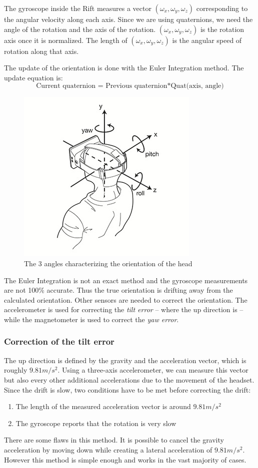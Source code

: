 \documentclass[12pt, twoside]{article}
\begin{document}
The gyroscope inside the Rift measures a vector $(\omega_x,\omega_y,\omega_z)$ corresponding to the angular velocity along each axis. Since we are using quaternions, we need the angle of the rotation and the axis of the rotation. $(\omega_x,\omega_y,\omega_z)$ is the rotation axis once it is normalized. The length of $(\omega_x,\omega_y,\omega_z)$ is the angular speed of rotation along that axis.

The update of the orientation is done with the Euler Integration method. The update equation is:
$$\text{Current quaternion = Previous quaternion} * \text{Quat(axis, angle)}$$

\begin{figure}[h]
  \centering
  \includegraphics[scale=3]{OculusHead.jpg}
  \caption{\label{fig:ypr} The 3 angles characterizing the orientation of the head\protect\footnotemark}
\end{figure}

The Euler Integration is not an exact method and the gyroscope measurements are not 100\% accurate. Thus the true orientation is drifting away from the calculated orientation. Other sensors are needed to correct the orientation. The accelerometer is used for correcting the \textit{tilt error} -- where the up direction is -- while the magnetometer is used to correct the \textit{yaw error}.

\subsubsection{Correction of the tilt error}
The up direction is defined by the gravity and the acceleration vector, which is roughly $9.81m/s^2$. Using a three-axis accelerometer, we can measure this vector but also every other additional accelerations due to the movement of the headset. Since the drift is slow, two conditions have to be met before correcting the drift:
\begin{enumerate}
\item The length of the measured acceleration vector is around $9.81m/s^2$
\item The gyroscope reports that the rotation is very slow
\end{enumerate}
There are some flaws in this method. It is possible to cancel the gravity acceleration by moving down while creating a lateral acceleration of $9.81m/s^2$. However this method is simple enough and works in the vast majority of cases.
\end{document}
